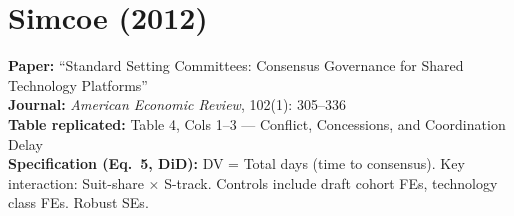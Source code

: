 \documentclass[11pt,a4paper]{article}
\begin{document}
\newpage

\section{Simcoe (2012)}

\textbf{Paper:} ``Standard Setting Committees: Consensus Governance for Shared Technology Platforms''\\
\textbf{Journal:} \textit{American Economic Review}, 102(1): 305--336\\
\textbf{Table replicated:} Table 4, Cols 1--3 --- Conflict, Concessions, and Coordination Delay\\
\textbf{Specification (Eq.\ 5, DiD):} DV = Total days (time to consensus). Key interaction: Suit-share $\times$ S-track. Controls include draft cohort FEs, technology class FEs. Robust SEs.

\vspace{0.3cm}
\noindent{}
\end{document}
